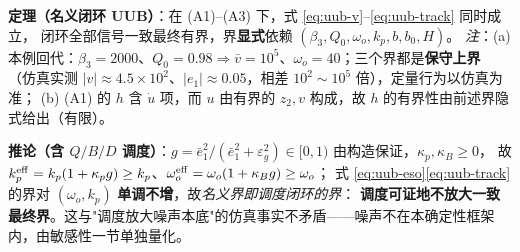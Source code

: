 \noindent\textbf{定理（名义闭环 UUB）}：在 (A1)--(A3) 下，式 \eqref{eq:uub-v}--\eqref{eq:uub-track} 同时成立，
闭环全部信号一致最终有界，界\textbf{显式}依赖 $(\beta_3,Q_0,\omega_o,k_p,b,b_0,H)$。
\emph{注}：(a) 本例回代：$\beta_3=2000$、$Q_0=0.98\Rightarrow\bar v=10^{5}$、$\omega_o=40$；三个界都是\textbf{保守上界}
（仿真实测 $|v|\approx4.5\times10^{2}$、$|e_1|\approx0.05$，相差 $10^{2}\sim10^{5}$ 倍），定量行为以仿真为准；
(b) (A1) 的 $h$ 含 $\dot u$ 项，而 $u$ 由有界的 $z_2,v$ 构成，故 $h$ 的有界性由前述界隐式给出（有限）。

\noindent\textbf{推论（含 $Q/B/D$ 调度）}：$g=\bar e_1^{2}/(\bar e_1^{2}+\varepsilon_g^{2})\in[0,1)$ 由构造保证，$\kappa_p,\kappa_B\ge0$，
故 $k_p^{\rm eff}=k_p(1+\kappa_pg)\ge k_p$、$\omega_o^{\rm eff}=\omega_o(1+\kappa_Bg)\ge\omega_o$；
式 \eqref{eq:uub-eso}\eqref{eq:uub-track} 的界对 $(\omega_o,k_p)$ \textbf{单调不增}，故\emph{名义界即调度闭环的界}：
\textbf{调度可证地不放大一致最终界}。这与"调度放大噪声本底"的仿真事实不矛盾——噪声不在本确定性框架内，由敏感性一节单独量化。

